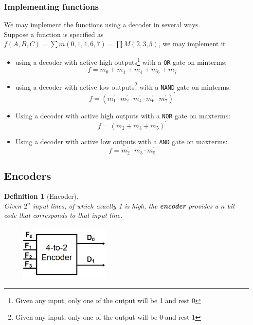 \documentclass[12pt]{article}
\newtheorem{definition}{Definition}[section]
\theoremstyle{definition}
\begin{document}
\subsubsection{Implementing functions}
We may implement the functions using a decoder in several ways.\\Suppose a function is specified as $f(A,B,C) = \sum m(0,1,4,6,7) = \prod M(2,3,5)$, we may implement it 
\begin{itemize}
  \item using a decoder with active high outputs\footnote{Given any input, only one of the output will be 1 and rest 0} with a \texttt{OR} gate on minterms:
  \[
f = m_0+m_1+m_4+m_6+m_7
  \]
  \item using a decoder with active low outputs\footnote{Given any input, only one of the output will be 0 and rest 1} with a \texttt{NAND} gate on minterms:
  \[
f = (m_1^\prime\cdot m_2^\prime\cdot m_4^\prime\cdot m_6^\prime\cdot m_7^\prime)^\prime
  \]
  \item Using a decoder with active high outputs with a \texttt{NOR} gate on maxterms:
  \[
f = (m_2+m_3+m_5)^\prime
  \]
  \item Using a decoder with active low outputs with a \texttt{AND} gate on maxterms:
  \[
f = m_2^\prime\cdot m_3^\prime\cdot m_5^\prime
  \]
\end{itemize}
\subsection{Encoders}
\begin{definition}[Encoder]
\hfill\\\normalfont Given $2^n$ input lines, of which \textit{exactly} 1 is high, the \textbf{encoder} provides a $n$ bit code that corresponds to that input line.
\end{definition}
\begin{figure}[h]
\centering
\includegraphics[width = 0.4\textwidth]{7_7.png}
\end{figure}
\end{document}
